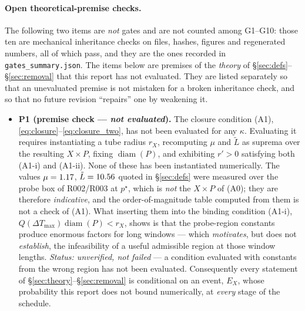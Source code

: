 \documentclass[11pt]{article}
\theoremstyle{remark}\newtheorem{remark}{Remark}
\newcommand{\pstar}{p^\star}
\begin{document}
\paragraph{Open theoretical-premise checks.}
The following two items are \emph{not} gates and are not counted among G1--G10: those ten are mechanical inheritance checks on files, hashes, figures and regenerated numbers, all of which pass, and they are the ones recorded in \texttt{gates\_summary.json}. The items below are premises of the \emph{theory} of \S\ref{sec:defs}--\S\ref{sec:removal} that this report has not evaluated. They are listed separately so that an unevaluated premise is not mistaken for a broken inheritance check, and so that no future revision ``repairs'' one by weakening it.
\begin{itemize}[nosep]
\item \textbf{P1 (premise check --- \emph{not evaluated}).} The closure condition (A1), \eqref{eq:closure}--\eqref{eq:closure_two}, has not been evaluated for any $\kappa$. Evaluating it requires instantiating a tube radius $r_X$, recomputing $\mu$ and $\tilde L$ as suprema over the resulting $X\times P$, fixing $\operatorname{diam}(P)$, and exhibiting $r'>0$ satisfying both (A1-i) and (A1-ii). None of these has been instantiated numerically. The values $\mu=1.17$, $\tilde L=10.56$ quoted in \S\ref{sec:defs} were measured over the probe box of R002/R003 at $\pstar$, which is \emph{not} the $X\times P$ of (A0); they are therefore \emph{indicative}, and the order-of-magnitude table computed from them is not a check of (A1). What inserting them into the binding condition (A1-i), $Q(\Delta T_{\max})\operatorname{diam}(P)<r_X$, shows is that the probe-region constants produce enormous factors for long windows --- which \emph{motivates}, but does not \emph{establish}, the infeasibility of a useful admissible region at those window lengths. \emph{Status: unverified, not failed} --- a condition evaluated with constants from the wrong region has not been evaluated. Consequently every statement of \S\ref{sec:theory}--\S\ref{sec:removal} is conditional on an event, $E_X$, whose probability this report does not bound numerically, at \emph{every} stage of the schedule.

\end{itemize}
\end{document}
